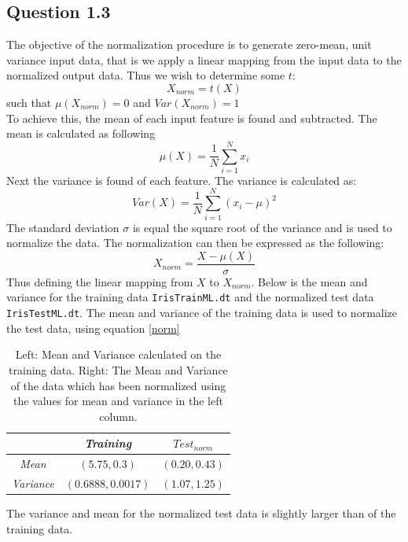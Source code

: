 \documentclass{article}
\begin{document}
\subsection{Question 1.3}
The objective of the normalization procedure is to generate zero-mean, unit variance input data, that is we apply a linear mapping from the input data to the normalized output data. Thus we wish to determine some  $t$:
\begin{equation}
X_{norm}=t(X)
\end{equation}
such that $\mu(X_{norm})=0$ and $Var(X_{norm})=1$ \\
To achieve this, the mean of each input feature is found and subtracted. The mean is calculated as following
\begin{equation*}
\mu(X) = \dfrac{1}{N} \sum\limits^{N}_{i=1}x_i
\end{equation*}
 Next the variance is found of each feature. The variance is calculated as:
\begin{equation*}
Var(X) = \dfrac{1}{N} \sum\limits^{N}_{i=1}(x_i - \mu)^2
\end{equation*}
The standard deviation $\sigma$ is equal the square root of the variance and is used to normalize the data. The normalization can then be expressed as the following:
\begin{equation}
X_{norm} = \dfrac{X - \mu(X) }{\sigma}
\label{norm}
\end{equation}
Thus defining the linear mapping from $X$ to $X_{norm}$. Below is the mean and variance for the training data \texttt{IrisTrainML.dt} and the normalized test data \texttt{IrisTestML.dt}. The mean and variance of the training data is used to normalize the test data, using equation \eqref{norm} \\
\begin{table}[H]
  \centering
  \label{tab:table1}
  \begin{tabular}{c||c|c}
    \textsf{ } & \textsl{Training} & \textsl{$Test_{norm}$} \\
    \hline
    \textsl{Mean} & $(5.75,0.3)$ & $(0.20,0.43)$ \\
    \textsl{Variance} & $(0.6888,0.0017)$ & $(1.07,1.25)$ \\    
  \end{tabular}
  \caption{Left: Mean and Variance calculated on the training data. Right: The Mean and Variance of the data which has been normalized using the values for mean and variance in the left column.} 
\end{table}
The variance and mean for the normalized test data is slightly larger than of the training data.
\end{document}
